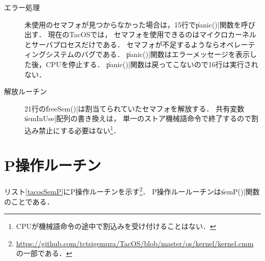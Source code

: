 \begin{description}
\item [エラー処理]
  未使用のセマフォが見つからなかった場合は，15行で\|panic()|関数を呼び出す．
  現在のTacOSでは，
  セマフォを使用できるのはマイクロカーネルとサーバプロセスだけである．
  セマフォが不足するようならオペレーティングシステムのバグである．
  \|panic()|関数はエラーメッセージを表示した後，CPUを停止する．
  \|panic()|関数は戻ってこないので16行は実行されない．

\item [解放ルーチン]
  21行の\|freeSem()|は割当てられていたセマフォを解放する．
  共有変数\|semInUse|配列の書き換えは，
  単一のストア機械語命令で終了するので割込み禁止にする必要はない\footnote{
    CPUが機械語命令の途中で割込みを受け付けることはない．}．
\end{description}

\section{P操作ルーチン}
リスト\ref{tacosSemP}にP操作ルーチンを示す\footnote{
  \url{https://github.com/tctsigemura/TacOS/blob/master/os/kernel/kernel.cmm}
  の一部である．}．
P操作ルールーチンは\|semP()|関数のことである．



